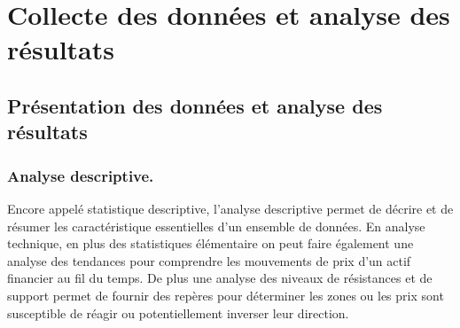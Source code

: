 \section{Collecte des données et analyse des résultats}

\subsection{Présentation des données et analyse des résultats}

\subsubsection{Analyse descriptive.}
\par{Encore appelé statistique descriptive, l'analyse descriptive
    permet de décrire et de résumer les caractéristique essentielles d'un ensemble de données.
    En analyse technique, en plus des statistiques élémentaire on peut faire 
    également une analyse des tendances 
    pour comprendre les mouvements de prix d'un actif financier au fil du temps.
    De  plus une analyse des niveaux de résistances et de support permet de fournir 
    des repères pour déterminer les
    zones ou les prix sont susceptible de réagir ou potentiellement inverser leur direction.}

